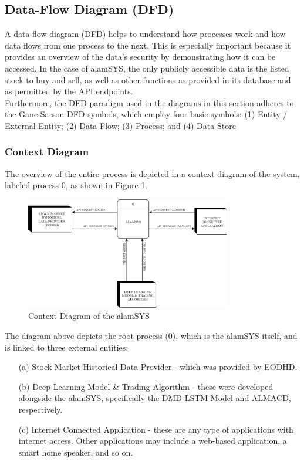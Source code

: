\subsection{Data-Flow Diagram (DFD)}
\label{subsec:dfd}
A data-flow diagram (DFD) helps to understand how processes work and how data flows 
from one process to the next. This is especially important because it provides an 
overview of the data's security by demonstrating how it can be accessed. 
In the case of alamSYS, the only publicly accessible data is the listed stock to buy and sell, 
as well as other functions as provided in its database and as permitted by the API endpoints.
\hfill \\

Furthermore, the DFD paradigm used in the diagrams in this section adheres to 
the Gane-Sarson DFD symbols, which employ four basic symbols: 
(1) Entity / External Entity; 
(2) Data Flow; 
(3) Process; and 
(4) Data Store 
\cite{VisualParadigm}


\subsubsection{Context Diagram}
\label{subsubsec:context_dfd}
The overview of the entire process is depicted in a context diagram of the system, 
labeled process 0, as shown in Figure
\ref{fig:context_dfd}.
\begin{figure}[ht]
    \centering
    \includegraphics[width=0.80\textwidth]{./assets/Chapter_3/DFD/DFD_Context.png}
    \caption{Context Diagram of the alamSYS}
    \label{fig:context_dfd}
\end{figure}
\FloatBarrier
\vspace{0.5cm}
The diagram above depicts the root process (0), which is the alamSYS itself, 
and is linked to three external entities: 
\begin{itemize}
    \item[(a)] Stock Market Historical Data Provider - 
    which was provided by EODHD.
    \item[(b)] Deep Learning Model \& Trading Algorithm - these were 
    developed alongside the alamSYS, specifically the DMD-LSTM Model and ALMACD, respectively.
    \item[(c)] Internet Connected Application - these are any type of applications with internet access. 
    Other applications may include a web-based application, a smart home speaker, and so on.
\end{itemize}

